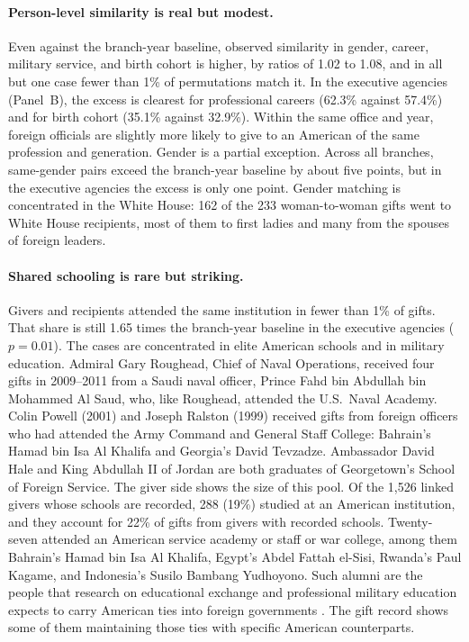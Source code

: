 \documentclass[11pt]{article}
\begin{document}
\paragraph{Person-level similarity is real but modest.} Even against the branch-year baseline, observed similarity in gender, career, military service, and birth cohort is higher, by ratios of 1.02 to 1.08, and in all but one case fewer than 1\% of permutations match it. In the executive agencies (Panel~B), the excess is clearest for professional careers (62.3\% against 57.4\%) and for birth cohort (35.1\% against 32.9\%). Within the same office and year, foreign officials are slightly more likely to give to an American of the same profession and generation. Gender is a partial exception. Across all branches, same-gender pairs exceed the branch-year baseline by about five points, but in the executive agencies the excess is only one point. Gender matching is concentrated in the White House: 162 of the 233 woman-to-woman gifts went to White House recipients, most of them to first ladies and many from the spouses of foreign leaders.

\paragraph{Shared schooling is rare but striking.} Givers and recipients attended the same institution in fewer than 1\% of gifts. That share is still 1.65 times the branch-year baseline in the executive agencies ($p=0.01$). The cases are concentrated in elite American schools and in military education. Admiral Gary Roughead, Chief of Naval Operations, received four gifts in 2009--2011 from a Saudi naval officer, Prince Fahd bin Abdullah bin Mohammed Al Saud, who, like Roughead, attended the U.S.\ Naval Academy. Colin Powell (2001) and Joseph Ralston (1999) received gifts from foreign officers who had attended the Army Command and General Staff College: Bahrain's Hamad bin Isa Al Khalifa and Georgia's David Tevzadze. Ambassador David Hale and King Abdullah II of Jordan are both graduates of Georgetown's School of Foreign Service. The giver side shows the size of this pool. Of the 1,526 linked givers whose schools are recorded, 288 (19\%) studied at an American institution, and they account for 22\% of gifts from givers with recorded schools. Twenty-seven attended an American service academy or staff or war college, among them Bahrain's Hamad bin Isa Al Khalifa, Egypt's Abdel Fattah el-Sisi, Rwanda's Paul Kagame, and Indonesia's Susilo Bambang Yudhoyono. Such alumni are the people that research on educational exchange and professional military education expects to carry American ties into foreign governments \citep{atkinson2010soft,ruby2010pme,gift2017who}. The gift record shows some of them maintaining those ties with specific American counterparts.
\end{document}

